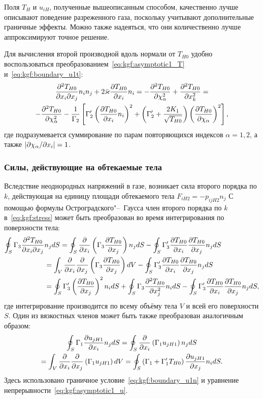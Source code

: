 Поля \(T_H\) и \(u_{iH}\), полученные вышеописанным способом,
качественно лучше описывают поведение разреженного газа,
поскольку учитывают дополнительные граничные эффекты.
Можно также надеяться, что они количественно лучше аппроксимируют точное решение.

Для вычисления второй производной вдоль нормали от \(T_{H0}\)
удобно воспользоваться преобразованием~\eqref{eq:kgf:asymptotic1_T} и~\eqref{eq:kgf:boundary_u1t}:
\begin{multline*}
    \pderder[T_{H0}]{x_i}{x_j}n_i n_j + 2\bar\kappa\pder[T_{H0}]{x_i}n_i =
        - \pderdual[T_{H0}]{\chi_\alpha} + \pderdual[T_{H0}]{x_k} = \\
    - \pderdual[T_{H0}]{\chi_\alpha} - \frac1{\Gamma_2} \left[
        \Gamma_2'\left(\pder[T_{H0}]{x_i}n_i\right)^2 +
        \left(\Gamma_2'+\frac{2K_1}{\sqrt{T_{H0}}}\right) \left(\pder[T_{H0}]{\chi_\alpha}\right)^2
    \right],
\end{multline*}
где подразумевается суммирование по парам повторяющихся индексов \(\alpha=1,2\),
а также \(|\Pder[\chi_\alpha]{x_i}| = 1\).

\subsubsection{Силы, действующие на обтекаемые тела}

Вследствие неоднородных напряжений в газе, возникает сила второго порядка по \(k\),
действующая на единицу площади обтекаемого тела \(F_{iH2} = -p_{ijH2}n_j\)
С помощью формулы Остроградского"--~Гаусса член второго порядка по \(k\) в~\eqref{eq:kgf:stress}
может быть преобразован во время интегрирования по поверхности тела:
\begin{align*}
    \oint_S \Gamma_3\pderder[T_{H0}]{x_i}{x_j} &n_j\dd{S}
         = \oint_S \pder{x_i} \left( \Gamma_3\pder[T_{H0}]{x_j} \right) n_j\dd{S}
        - \oint_S \Gamma_3'\pder[T_{H0}]{x_i}\pder[T_{H0}]{x_j} n_j\dd{S} \\
        &= \int_V \pder{x_i}\pder{x_j} \left( \Gamma_3 \pder[T_{H0}]{x_j} \right) \dd{V}
        - \oint_S \Gamma_3'\pder[T_{H0}]{x_i}\pder[T_{H0}]{x_j} n_j\dd{S} \\
        &= \oint_S \Gamma_3'\left(\pder[T_{H0}]{x_j}\right)^2 n_i\dd{S}
        + \oint_S \Gamma_3\pderdual[T_{H0}]{x_j} n_i\dd{S}
        - \oint_S \Gamma_3'\pder[T_{H0}]{x_i}\pder[T_{H0}]{x_j} n_j\dd{S},
\end{align*}
где интегрирование производится по всему объёму тела \(V\) и всей его поверхности \(S\).
Один из вязкостных членов может быть также преобразован аналогичным образом:
\begin{multline*}
    \oint_S \Gamma_1\pder[u_{jH1}]{x_i} n_j\dd{S}
        = \oint_S \pder{x_i} \left( \Gamma_1 u_{jH1} \right) n_j\dd{S} \\
        = \int_V \pder{x_i}\pder{x_j} \left( \Gamma_1 u_{jH1} \right) \dd{V}
        = \oint_S \left( \Gamma_1 + \Gamma_1'T_{H0} \right) \pder[u_{jH1}]{x_j} n_i\dd{S}.
\end{multline*}
Здесь использовано граничное условие~\eqref{eq:kgf:boundary_u1n} и уравнение непрерывности~\eqref{eq:kgf:asymptotic1_u}.


